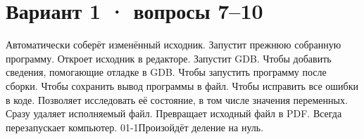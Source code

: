 \documentclass[a4paper,12pt]{extarticle}
\begin{document}

\newpage
\section*{Вариант 1 · вопросы 7–10}
\begin{enumerate}
\setcounter{enumi}{6}
\setlength{\itemsep}{6mm}
  {Автоматически соберёт изменённый исходник.}
  {Запустит прежнюю собранную программу.}
  {Откроет исходник в редакторе.}
  {Запустит GDB.}
  {Чтобы добавить сведения, помогающие отладке в GDB.}
  {Чтобы запустить программу после сборки.}
  {Чтобы сохранить вывод программы в файл.}
  {Чтобы исправить все ошибки в коде.}
  {Позволяет исследовать её состояние, в том числе значения переменных.}
  {Сразу удаляет исполняемый файл.}
  {Превращает исходный файл в PDF.}
  {Всегда перезапускает компьютер.}
  {0}{1}{-1}{Произойдёт деление на нуль.}
\end{enumerate}
\answergrid
\end{document}
